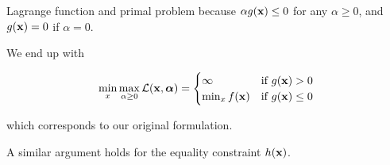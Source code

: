 \begin{vbframe}{Lagrange function and primal problem}
because $\alpha g(\mathbf{x}) \le 0$ for any $\alpha \ge 0$, and $g(\mathbf{x}) = 0$ if $\alpha = 0$. 

\framebreak 

We end up with 

\begin{eqnarray*}
	\min_x\max_{\alpha \ge 0} \mathcal{L}(\mathbf{x}, \bm{\alpha}) = \begin{cases} \infty & \text{if } g(\mathbf{x}) > 0 \\ \min_x f(\mathbf{x}) & \text{if }  g(\mathbf{x}) \le 0\end{cases}
\end{eqnarray*}

which corresponds to our original formulation. 

\vspace*{0.2cm} 

A similar argument holds for the equality constraint $h(\mathbf{x})$.

\end{vbframe}



